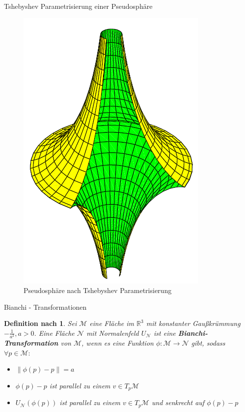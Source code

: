 \documentclass[12pt]{beamer}
\newtheorem{mydef}{Definition nach \cite{gray}}
\newcommand{\norm}[1]{\left\lVert#1\right\rVert}
\begin{document}
\begin{frame}{Tshebyshev Parametrisierung einer Pseudosphäre}
\begin{figure}[h!]
\includegraphics[scale=0.5]{pseudosphere_tchebyshev.png}
\caption{Pseudosphäre nach Tshebyshev Parametrisierung}
\end{figure}
\end{frame}

\begin{frame}{Bianchi - Transformationen}
\begin{mydef}
Sei $\mathcal{M}$ eine Fläche im $\mathbb{R}^3$ mit konstanter Gaußkrümmung $-\frac{1}{a^2}, a > 0$. \newline Eine Fläche $\mathcal{N}$ mit Normalenfeld $U_{\mathcal{N}}$ ist eine \textbf{Bianchi-Transformation} von $\mathcal{M}$, wenn es eine Funktion $\phi : \mathcal{M} \rightarrow \mathcal{N}$ gibt, sodass $\forall p \in \mathcal{M}:$\newline
\begin{itemize}
\item $\norm{\phi (p) - p} = a$
\item $\phi (p) - p$ ist parallel zu einem $v \in T_{p}\mathcal{M}$
\item $U_{\mathcal{N}} (\phi (p))$ ist parallel zu einem $v \in T_{p}\mathcal{M}$ und senkrecht auf $\phi (p) - p$
\end{itemize}
\end{mydef}
\end{frame}
\end{document}
